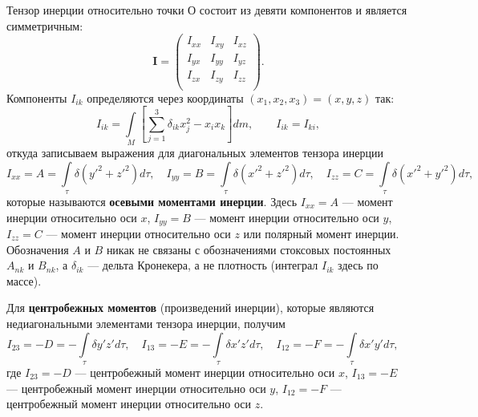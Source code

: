 \documentclass[11pt, a4paper,addpoints]{exam}
\theoremstyle{remark}
\begin{document}
    Тензор инерции относительно точки О состоит из девяти компонентов и является симметричным:
    \begin{equation*}
        \pmb I = \begin{pmatrix}
            I_{xx} & I_{xy} & I_{xz} \\
            I_{yx} & I_{yy} & I_{yz} \\
            I_{zx} & I_{zy} & I_{zz} \\
        \end{pmatrix}.
    \end{equation*}
    Компоненты $I_{ik}$ определяются через координаты $(x_1, x_2, x_3) = (x, y, z)$ так:
    \begin{equation*}
        I_{ik} = \int\limits_M 
        \left[ \sum\limits_{j = 1}^{3} \delta_{ik} x_j^2 - x_i x_k \right] dm, \qquad
        I_{ik} = I_{ki},
    \end{equation*}
    откуда записываем  выражения для диагональных элементов тензора инерции
    \begin{equation*}
        I_{xx} = A = \int\limits_\tau \delta \left( y'^2 + z'^2 \right) d\tau, \quad
        I_{yy} = B = \int\limits_\tau \delta \left( x'^2 + z'^2 \right) d\tau, \quad
        I_{zz} = C = \int\limits_\tau \delta \left( x'^2 + y'^2 \right) d\tau, \quad
    \end{equation*}
    которые называются \textbf{осевыми моментами инерции}. Здесь $I_{xx} = A$ --- момент инерции относительно
    оси $x$, $I_{yy} = B$ --- момент инерции относительно оси $y$,
    $I_{zz} = C$ --- момент инерции относительно оси $z$ или полярный момент инерции.
    Обозначения $A$ и $B$ никак не связаны с обозначениями стоксовых постоянных $A_{nk}$ и
    $B_{nk}$, а $\delta_{ik}$ --- дельта Кронекера, а не плотность (интеграл $I_{ik}$ здесь по массе).

    Для  \textbf{центробежных моментов} (произведений инерции), которые являются недиагональными элементами
    тензора инерции, получим
    \begin{equation*}
        I_{23} = -D = -\int\limits_\tau \delta y' z' d\tau, \quad
        I_{13} = -E = -\int\limits_\tau \delta x' z' d\tau, \quad
        I_{12} = -F = -\int\limits_\tau \delta x' y' d\tau, \quad
    \end{equation*}
    где $I_{23} = -D$ --- центробежный момент инерции относительно оси $x$,
    $I_{13} = -E$ --- центробежный момент инерции относительно оси $y$,
    $I_{12} = -F$ --- центробежный момент инерции относительно оси $z$.
\end{document}
